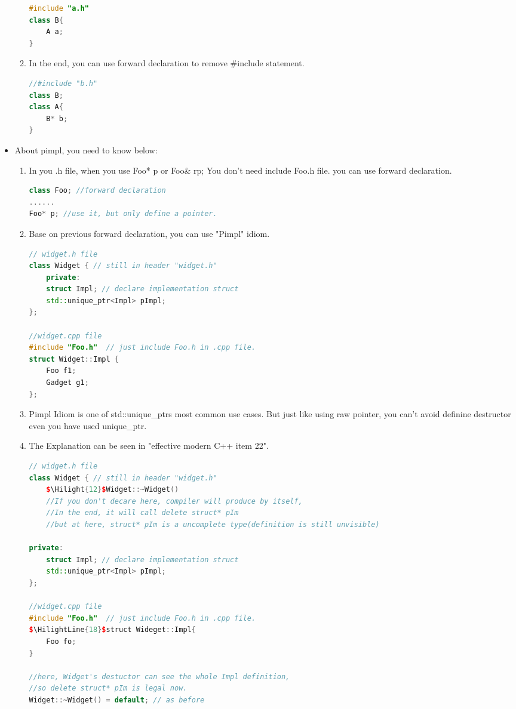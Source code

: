 \documentclass[a4paper,12pt,twoside]{book}
\newcommand{\Hilight}[1]{\makebox[0pt][l]{\color{yellow}\rule[-3pt]{#1em}{11pt}}}
\newcommand{\HilightLine}[2][yellow]{\makebox[0pt][l]{\color{#1}\rule[-4pt]{#2em}{13.9pt}}}
\begin{document}
\begin{itemize}
\begin{enumerate}
\begin{lstlisting}[frame=single, language=c++]
#include "a.h"
class B{
	A a;
}
\end{lstlisting}
		\item In the end, you can use forward declaration to remove \#include statement. 
\begin{lstlisting}[frame=single, language=c++]
//#include "b.h"
class B;
class A{
	B* b;
}
\end{lstlisting}
	\end{enumerate}
	
	\item About pimpl, you need to know below:
	\begin{enumerate}
		\item In you .h file, when you use Foo* p or Foo\& rp; You don't need include Foo.h file. you can use forward declaration.
\begin{lstlisting}[frame=single, language=c++]
class Foo; //forward declaration
......
Foo* p; //use it, but only define a pointer.
\end{lstlisting}
		
		\item Base on previous forward declaration, you can use "Pimpl" idiom.
\begin{lstlisting}[frame=single, language=c++]
// widget.h file
class Widget { // still in header "widget.h"
	private:
	struct Impl; // declare implementation struct
	std::unique_ptr<Impl> pImpl;
};
		
//widget.cpp file
#include "Foo.h"  // just include Foo.h in .cpp file.
struct Widget::Impl {
	Foo f1;
	Gadget g1;
};
\end{lstlisting}
		
		\item Pimpl Idiom is one of std::unique\_ptrs most common use cases. But just like using raw pointer,  you can't avoid definine destructor even you have used unique\_ptr. 
		
		\item The Explanation can be seen in "effective modern C++ item 22". 
\begin{lstlisting}[frame=single, language=c++, mathescape=true]
// widget.h file
class Widget { // still in header "widget.h"
	$\Hilight{12}$Widget::~Widget()
	//If you don't decare here, compiler will produce by itself,
	//In the end, it will call delete struct* pIm
	//but at here, struct* pIm is a uncomplete type(definition is still unvisible)

private:
	struct Impl; // declare implementation struct
	std::unique_ptr<Impl> pImpl;
};
		
//widget.cpp file
#include "Foo.h"  // just include Foo.h in .cpp file.
$\HilightLine{18}$struct Wideget::Impl{
	Foo fo; 
}

//here, Widget's destuctor can see the whole Impl definition,
//so delete struct* pIm is legal now.
Widget::~Widget() = default; // as before
	
\end{lstlisting}
	\end{enumerate}
\end{itemize}
\end{document}
